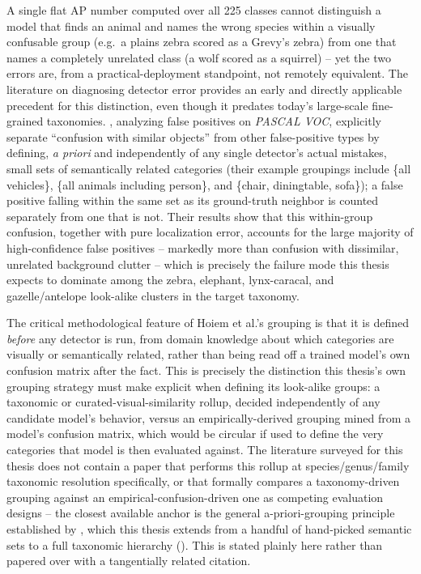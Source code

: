 A single flat AP number computed over all 225 classes cannot distinguish a model that finds an animal and names the wrong species within a visually confusable group (e.g.\ a plains zebra scored as a Grevy's zebra) from one that names a completely unrelated class (a wolf scored as a squirrel) -- yet the two errors are, from a practical-deployment standpoint, not remotely equivalent. The literature on diagnosing detector error provides an early and directly applicable precedent for this distinction, even though it predates today's large-scale fine-grained taxonomies. \textcite{hoiemDiagnosingErrorObject2012}, analyzing false positives on \textit{PASCAL VOC}, explicitly separate ``confusion with similar objects'' from other false-positive types by defining, \textit{a priori} and independently of any single detector's actual mistakes, small sets of semantically related categories (their example groupings include \{all vehicles\}, \{all animals including person\}, and \{chair, diningtable, sofa\}); a false positive falling within the same set as its ground-truth neighbor is counted separately from one that is not. Their results show that this within-group confusion, together with pure localization error, accounts for the large majority of high-confidence false positives -- markedly more than confusion with dissimilar, unrelated background clutter -- which is precisely the failure mode this thesis expects to dominate among the zebra, elephant, lynx-caracal, and gazelle/antelope look-alike clusters in the target taxonomy.

The critical methodological feature of Hoiem et al.'s grouping is that it is defined \textit{before} any detector is run, from domain knowledge about which categories are visually or semantically related, rather than being read off a trained model's own confusion matrix after the fact. This is precisely the distinction this thesis's own grouping strategy must make explicit when defining its look-alike groups: a taxonomic or curated-visual-similarity rollup, decided independently of any candidate model's behavior, versus an empirically-derived grouping mined from a model's confusion matrix, which would be circular if used to define the very categories that model is then evaluated against. The literature surveyed for this thesis does not contain a paper that performs this rollup at species/genus/family taxonomic resolution specifically, or that formally compares a taxonomy-driven grouping against an empirical-confusion-driven one as competing evaluation designs -- the closest available anchor is the general a-priori-grouping principle established by \textcite{hoiemDiagnosingErrorObject2012}, which this thesis extends from a handful of hand-picked semantic sets to a full taxonomic hierarchy (). This is stated plainly here rather than papered over with a tangentially related citation.

